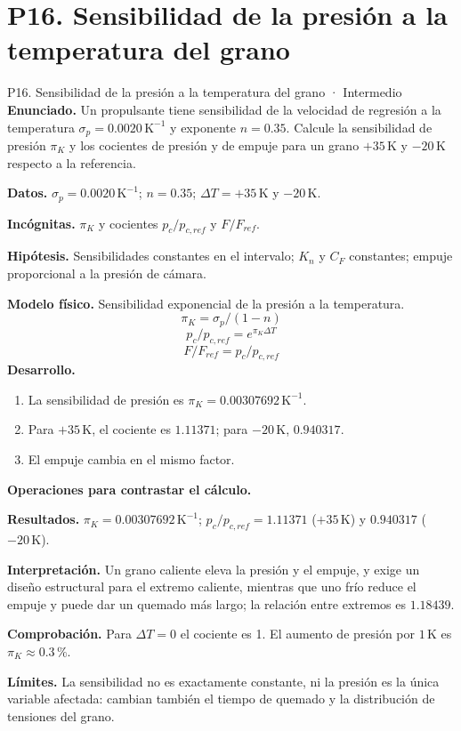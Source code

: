 \section{P16. Sensibilidad de la presión a la temperatura del grano}
\begin{studiumworked}{P16. Sensibilidad de la presión a la temperatura del grano · Intermedio}
\textbf{Enunciado.} Un propulsante tiene sensibilidad de la velocidad de regresión a la temperatura $\sigma_p=0.0020\,\mathrm{K^{-1}}$ y exponente $n=0.35$. Calcule la sensibilidad de presión $\pi_K$ y los cocientes de presión y de empuje para un grano $+35\,\mathrm K$ y $-20\,\mathrm K$ respecto a la referencia.

\textbf{Datos.} $\sigma_p=0.0020\,\mathrm{K^{-1}}$; $n=0.35$; $\Delta T=+35\,\mathrm K$ y $-20\,\mathrm K$.

\textbf{Incógnitas.} $\pi_K$ y cocientes $p_c/p_{c,ref}$ y $F/F_{ref}$.

\textbf{Hipótesis.} Sensibilidades constantes en el intervalo; $K_n$ y $C_F$ constantes; empuje proporcional a la presión de cámara.

\textbf{Modelo físico.} Sensibilidad exponencial de la presión a la temperatura.
\[\pi_K=\sigma_p/(1-n)\]
\[p_c/p_{c,ref}=e^{\pi_K\Delta T}\]
\[F/F_{ref}=p_c/p_{c,ref}\]
\textbf{Desarrollo.}
\begin{enumerate}
\item La sensibilidad de presión es $\pi_K=0.00307692\,\mathrm{K^{-1}}$.
\item Para $+35\,\mathrm K$, el cociente es $1.11371$; para $-20\,\mathrm K$, $0.940317$.
\item El empuje cambia en el mismo factor.
\end{enumerate}
\textbf{Operaciones para contrastar el cálculo.}

\textbf{Resultados.} $\pi_K=0.00307692\,\mathrm{K^{-1}}$; $p_c/p_{c,ref}=1.11371$ ($+35\,\mathrm K$) y $0.940317$ ($-20\,\mathrm K$).

\textbf{Interpretación.} Un grano caliente eleva la presión y el empuje, y exige un diseño estructural para el extremo caliente, mientras que uno frío reduce el empuje y puede dar un quemado más largo; la relación entre extremos es $1.18439$.

\textbf{Comprobación.} Para $\Delta T=0$ el cociente es 1. El aumento de presión por $1\,\mathrm K$ es $\pi_K\approx0.3\,\%$.

\textbf{Límites.} La sensibilidad no es exactamente constante, ni la presión es la única variable afectada: cambian también el tiempo de quemado y la distribución de tensiones del grano.
\end{studiumworked}
